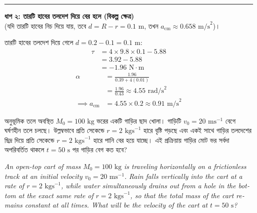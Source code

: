 \documentclass[12pt, a4paper]{article}
\begin{document}
\begin{tcolorbox}[solutionbox={সমাধান (Solution)}]
    \vspace{0.8em}
    \hrule
    \vspace{0.8em}
    
    \noindent\textbf{ধাপ ২: তারটি হাবের তলদেশ দিয়ে বের হলে (বিকল্প ক্ষেত্র)} \\
    (যদি তারটি হাবের নিচ দিয়ে যায়, তবে $d = R - r = 0.1\text{ m}$, তখন $a_{\text{cm}} \approx 0.658\text{ m/s}^2$)।
    
    তারটি হাবের তলদেশ দিয়ে গেলে $d = 0.2 - 0.1 = 0.1\text{ m}$:
    \begin{align*}
        \tau &= 4 \times 9.8 \times 0.1 - 5.88 \\
        &= 3.92 - 5.88 \\
        &= -1.96\text{ N}\cdot\text{m}
    \end{align*}
    \begin{align*}
        \alpha &= \frac{1.96}{0.39 + 4(0.01)} \\
        &= \frac{1.96}{0.43} \approx 4.55\text{ rad/s}^2 \\
        \implies a_{\text{cm}} &= 4.55 \times 0.2 \approx \mathbf{0.91}\text{ m/s}^2
    \end{align*}
\end{tcolorbox}

\begin{tcolorbox}[questionbox={প্রশ্ন (Question) 7}]
    \noindent
    অনুভূমিক তলে অবস্থিত $M_0 = 100\text{ kg}$ ভরের একটি গাড়ির ছাদ খোলা। গাড়িটি $v_0 = 20\text{ ms}^{-1}$ বেগে ঘর্ষণহীন তলে চলছে। উল্লম্বভাবে প্রতি সেকেন্ডে $r = 2\text{ kgs}^{-1}$ হারে বৃষ্টি পড়ছে এবং একই সাথে গাড়ির তলদেশের ছিদ্র দিয়ে প্রতি সেকেন্ডে $r = 2\text{ kgs}^{-1}$ হারে পানি বের হয়ে যাচ্ছে। এই প্রক্রিয়ায় গাড়ির মোট ভর সর্বদা অপরিবর্তিত থাকলে $t = 50\text{ s}$ পর গাড়ির বেগ কত হবে?
    
    \vspace{0.8em}
    \begin{english}
    \noindent\textit{\color{darkgray}
    An open-top cart of mass $M_0 = 100\text{ kg}$ is traveling horizontally on a frictionless track at an initial velocity $v_0 = 20\text{ ms}^{-1}$. Rain falls vertically into the cart at a rate of $r = 2\text{ kgs}^{-1}$, while water simultaneously drains out from a hole in the bottom at the exact same rate of $r = 2\text{ kgs}^{-1}$, so that the total mass of the cart remains constant at all times. What will be the velocity of the cart at $t = 50\text{ s}$?
    }
    \end{english}
\end{tcolorbox}
\end{document}
